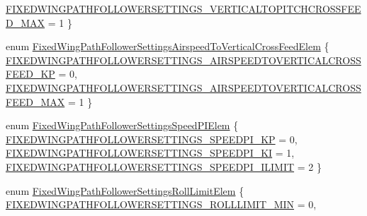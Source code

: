\begin{DoxyCompactItemize}
\hyperlink{group___fixed_wing_path_follower_settings_ggaa67f8b1fcfada832142c7e20a632b84da84b06a9f1e630bcec5bad1db633d266b}{\-F\-I\-X\-E\-D\-W\-I\-N\-G\-P\-A\-T\-H\-F\-O\-L\-L\-O\-W\-E\-R\-S\-E\-T\-T\-I\-N\-G\-S\-\_\-\-V\-E\-R\-T\-I\-C\-A\-L\-T\-O\-P\-I\-T\-C\-H\-C\-R\-O\-S\-S\-F\-E\-E\-D\-\_\-\-M\-A\-X} = 1
 \}
\item 
enum \hyperlink{group___fixed_wing_path_follower_settings_gae9577f25f69556e82b5512cac03151a3}{\-Fixed\-Wing\-Path\-Follower\-Settings\-Airspeed\-To\-Vertical\-Cross\-Feed\-Elem} \{ \hyperlink{group___fixed_wing_path_follower_settings_ggae9577f25f69556e82b5512cac03151a3ac7c24b6fa099d552488a26fab850e2bb}{\-F\-I\-X\-E\-D\-W\-I\-N\-G\-P\-A\-T\-H\-F\-O\-L\-L\-O\-W\-E\-R\-S\-E\-T\-T\-I\-N\-G\-S\-\_\-\-A\-I\-R\-S\-P\-E\-E\-D\-T\-O\-V\-E\-R\-T\-I\-C\-A\-L\-C\-R\-O\-S\-S\-F\-E\-E\-D\-\_\-\-K\-P} = 0, 
\hyperlink{group___fixed_wing_path_follower_settings_ggae9577f25f69556e82b5512cac03151a3aa6176f5c9ee80f51ecf03c7810d07970}{\-F\-I\-X\-E\-D\-W\-I\-N\-G\-P\-A\-T\-H\-F\-O\-L\-L\-O\-W\-E\-R\-S\-E\-T\-T\-I\-N\-G\-S\-\_\-\-A\-I\-R\-S\-P\-E\-E\-D\-T\-O\-V\-E\-R\-T\-I\-C\-A\-L\-C\-R\-O\-S\-S\-F\-E\-E\-D\-\_\-\-M\-A\-X} = 1
 \}
\item 
enum \hyperlink{group___fixed_wing_path_follower_settings_ga5cdc8a0895214fb9ef85aa6829a68ef0}{\-Fixed\-Wing\-Path\-Follower\-Settings\-Speed\-P\-I\-Elem} \{ \hyperlink{group___fixed_wing_path_follower_settings_gga5cdc8a0895214fb9ef85aa6829a68ef0a306a1f7be00ab72f3414be62550dd528}{\-F\-I\-X\-E\-D\-W\-I\-N\-G\-P\-A\-T\-H\-F\-O\-L\-L\-O\-W\-E\-R\-S\-E\-T\-T\-I\-N\-G\-S\-\_\-\-S\-P\-E\-E\-D\-P\-I\-\_\-\-K\-P} = 0, 
\hyperlink{group___fixed_wing_path_follower_settings_gga5cdc8a0895214fb9ef85aa6829a68ef0adde70b120e26533e2736e1479e007549}{\-F\-I\-X\-E\-D\-W\-I\-N\-G\-P\-A\-T\-H\-F\-O\-L\-L\-O\-W\-E\-R\-S\-E\-T\-T\-I\-N\-G\-S\-\_\-\-S\-P\-E\-E\-D\-P\-I\-\_\-\-K\-I} = 1, 
\hyperlink{group___fixed_wing_path_follower_settings_gga5cdc8a0895214fb9ef85aa6829a68ef0ad801652e94552123ca7fd2b41c8c1a9a}{\-F\-I\-X\-E\-D\-W\-I\-N\-G\-P\-A\-T\-H\-F\-O\-L\-L\-O\-W\-E\-R\-S\-E\-T\-T\-I\-N\-G\-S\-\_\-\-S\-P\-E\-E\-D\-P\-I\-\_\-\-I\-L\-I\-M\-I\-T} = 2
 \}
\item 
enum \hyperlink{group___fixed_wing_path_follower_settings_ga3ee8ea2d3c59983cbe809de271499e5e}{\-Fixed\-Wing\-Path\-Follower\-Settings\-Roll\-Limit\-Elem} \{ \hyperlink{group___fixed_wing_path_follower_settings_gga3ee8ea2d3c59983cbe809de271499e5eaf114942b2134a938538c683771418664}{\-F\-I\-X\-E\-D\-W\-I\-N\-G\-P\-A\-T\-H\-F\-O\-L\-L\-O\-W\-E\-R\-S\-E\-T\-T\-I\-N\-G\-S\-\_\-\-R\-O\-L\-L\-L\-I\-M\-I\-T\-\_\-\-M\-I\-N} = 0, 

\end{DoxyCompactItemize}
